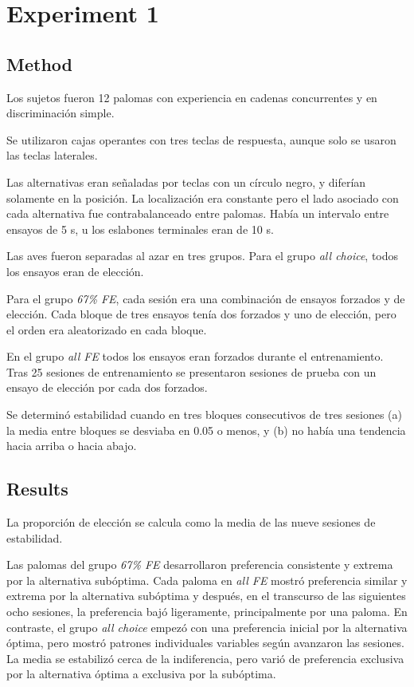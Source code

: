 \documentclass[a4paper,12pt]{article}
\begin{document}
\section{Experiment 1}

\subsection{Method}

Los sujetos fueron 12 palomas con experiencia en cadenas concurrentes y en discriminación simple.

Se utilizaron cajas operantes con tres teclas de respuesta, aunque solo se usaron las teclas laterales.

Las alternativas eran señaladas por teclas con un círculo negro, y diferían solamente en la posición.
La localización era constante pero el lado asociado con cada alternativa fue contrabalanceado entre palomas. 
Había un intervalo entre ensayos de 5 s, u los eslabones terminales eran de 10 s.

Las aves fueron separadas al azar en tres grupos.
Para el grupo {\itshape all choice}, todos los ensayos eran de elección.

Para el grupo {\itshape 67\% FE}, cada sesión era una combinación de ensayos forzados y de elección.
Cada bloque de tres ensayos tenía dos forzados y uno de elección, pero el orden era aleatorizado en cada bloque.

En el grupo {\itshape all FE} todos los ensayos eran forzados durante el entrenamiento.
Tras 25 sesiones de entrenamiento se presentaron sesiones de prueba con un ensayo de elección por cada dos forzados.

Se determinó estabilidad cuando en tres bloques consecutivos de tres sesiones (a) la media entre bloques se desviaba en 0.05 o menos, y (b) no había una tendencia hacia arriba o hacia abajo.

\subsection{Results}

La proporción de elección se calcula como la media de las nueve sesiones de estabilidad.

Las palomas del grupo {\itshape 67\% FE} desarrollaron preferencia consistente y extrema por la alternativa subóptima.
Cada paloma en {\itshape all FE} mostró preferencia similar y extrema por la alternativa subóptima y después, en el transcurso de las siguientes ocho sesiones, la preferencia bajó ligeramente, principalmente por una paloma.
En contraste, el grupo {\itshape all choice} empezó con una preferencia inicial por la alternativa óptima, pero mostró patrones individuales variables según avanzaron las sesiones.
La media se estabilizó cerca de la indiferencia, pero varió de preferencia exclusiva por la alternativa óptima a exclusiva por la subóptima.
\end{document}
